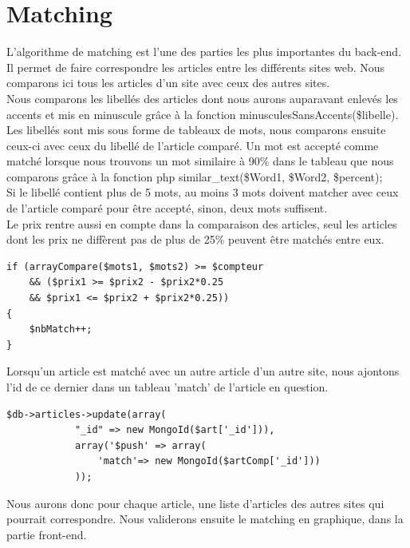 \documentclass{report}
\begin{document}
\section{Matching}
L'algorithme de matching est l'une des parties les plus importantes du back-end. Il permet de faire correspondre les articles entre les différents sites web. Nous comparons ici tous les articles d'un site avec ceux des autres sites.\\
Nous comparons les libellés des articles dont nous aurons auparavant enlevés les accents et mis en minuscule grâce à la fonction minusculesSansAccents(\$libelle). Les libellés sont mis sous forme de tableaux de mots, nous comparons ensuite ceux-ci avec ceux du libellé de l'article comparé. Un mot est accepté comme matché lorsque nous trouvons un mot similaire à 90\% dans le tableau que nous comparons grâce à la fonction php similar\_text(\$Word1, \$Word2, \$percent);\\
Si le libellé contient plus de 5 mots, au moins 3 mots doivent matcher avec ceux de l'article comparé pour être accepté, sinon, deux mots suffisent.\\
Le prix rentre aussi en compte dans la comparaison des articles, seul les articles dont les prix ne diffèrent pas de plus de 25\% peuvent être matchés entre eux.
\begin{lstlisting}
if (arrayCompare($mots1, $mots2) >= $compteur
	&& ($prix1 >= $prix2 - $prix2*0.25
	&& $prix1 <= $prix2 + $prix2*0.25))
{
	$nbMatch++;
}
\end{lstlisting}

Lorsqu'un article est matché avec un autre article d'un autre site, nous ajontons l'id de ce dernier dans un tableau 'match' de l'article en question.
\begin{lstlisting}
$db->articles->update(array(
			"_id" => new MongoId($art['_id'])),
			array('$push' => array(
				'match'=> new MongoId($artComp['_id']))
			));          
\end{lstlisting}

Nous aurons donc pour chaque article, une liste d'articles des autres sites qui pourrait correspondre. Nous validerons ensuite le matching en graphique, dans la partie front-end.
\newpage
\end{document}
